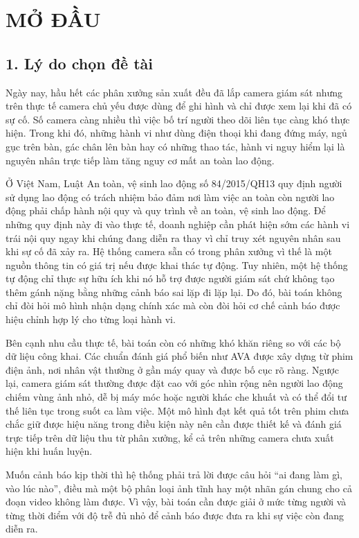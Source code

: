 \chapter*{MỞ ĐẦU}

\section*{1. Lý do chọn đề tài}

Ngày nay, hầu hết các phân xưởng sản xuất đều đã lắp camera giám sát nhưng trên thực tế camera chủ yếu được dùng để ghi hình và chỉ được xem lại khi đã có sự cố. Số camera càng nhiều thì việc bố trí người theo dõi liên tục càng khó thực hiện. Trong khi đó, những hành vi như dùng điện thoại khi đang đứng máy, ngủ gục trên bàn, gác chân lên bàn hay có những thao tác, hành vi nguy hiểm lại là nguyên nhân trực tiếp làm tăng nguy cơ mất an toàn lao động.

Ở Việt Nam, Luật An toàn, vệ sinh lao động số 84/2015/QH13 \cite{luat2015atvsld} quy định người sử dụng lao động có trách nhiệm bảo đảm nơi làm việc an toàn còn người lao động phải chấp hành nội quy và quy trình về an toàn, vệ sinh lao động. Để những quy định này đi vào thực tế, doanh nghiệp cần phát hiện sớm các hành vi trái nội quy ngay khi chúng đang diễn ra thay vì chỉ truy xét nguyên nhân sau khi sự cố đã xảy ra. Hệ thống camera sẵn có trong phân xưởng vì thế là một nguồn thông tin có giá trị nếu được khai thác tự động. Tuy nhiên, một hệ thống tự động chỉ thực sự hữu ích khi nó hỗ trợ được người giám sát chứ không tạo thêm gánh nặng bằng những cảnh báo sai lặp đi lặp lại. Do đó, bài toán không chỉ đòi hỏi mô hình nhận dạng chính xác mà còn đòi hỏi cơ chế cảnh báo được hiệu chỉnh hợp lý cho từng loại hành vi.

Bên cạnh nhu cầu thực tế, bài toán còn có những khó khăn riêng so với các bộ dữ liệu công khai. Các chuẩn đánh giá phổ biến như AVA được xây dựng từ phim điện ảnh, nơi nhân vật thường ở gần máy quay và được bố cục rõ ràng. Ngược lại, camera giám sát thường được đặt cao với góc nhìn rộng nên người lao động chiếm vùng ảnh nhỏ, dễ bị máy móc hoặc người khác che khuất và có thể đổi tư thế liên tục trong suốt ca làm việc. Một mô hình đạt kết quả tốt trên phim chưa chắc giữ được hiệu năng trong điều kiện này nên cần được thiết kế và đánh giá trực tiếp trên dữ liệu thu từ phân xưởng, kể cả trên những camera chưa xuất hiện khi huấn luyện.

Muốn cảnh báo kịp thời thì hệ thống phải trả lời được câu hỏi ``ai đang làm gì, vào lúc nào'', điều mà một bộ phân loại ảnh tĩnh hay một nhãn gán chung cho cả đoạn video không làm được. Vì vậy, bài toán cần được giải ở mức từng người và từng thời điểm với độ trễ đủ nhỏ để cảnh báo được đưa ra khi sự việc còn đang diễn ra.

